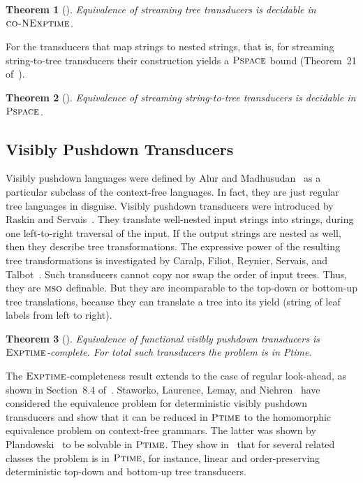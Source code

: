 \documentclass[copyright,creativecommons]{eptcs}
\newtheorem{theorem}{Theorem}
\newcommand{\mso}{\textsc{mso}}
\newcommand{\dexptime}{\textsc{Exptime}}
\newcommand{\conexptime}{\textsc{co-NExptime}}
\newcommand{\pspace}{\textsc{Pspace}}
\newcommand{\Ptime}{\textsc{Ptime}}
\begin{document}
\begin{theorem}[\cite{DBLP:journals/corr/abs-1104-2599}]
Equivalence of streaming tree transducers is decidable in $\conexptime$.
\end{theorem}

For the transducers that map strings to nested strings, that is, for streaming
string-to-tree transducers their construction yields a $\pspace$ bound
(Theorem~21 of~\cite{DBLP:journals/corr/abs-1104-2599}).

\begin{theorem}[\cite{DBLP:journals/corr/abs-1104-2599}]
Equivalence of streaming string-to-tree transducers is decidable in $\pspace$.
\end{theorem}

\subsection{Visibly Pushdown Transducers}

Visibly pushdown languages were defined by Alur and Madhusudan~\cite{DBLP:conf/stoc/AlurM04} as
a particular subclass of the context-free languages. In fact, they are
just regular tree languages in disguise.
Visibly pushdown transducers were introduced by 
Raskin and Servais~\cite{DBLP:conf/icalp/RaskinS08}.
They translate well-nested input strings into strings, during one left-to-right
traversal of the input. 
If the output strings are nested as well, then they describe tree
transformations. The expressive power of the resulting tree transformations
is investigated by Caralp, Filiot, Reynier, Servais, and 
Talbot~\cite{DBLP:journals/corr/CaralpFRST13}. 
Such transducers cannot copy nor swap the order of input trees. Thus, they
are $\mso$ definable. But they are incomparable to the top-down or bottom-up
tree translations, because they can translate a tree into its yield (string
of leaf labels from left to right).

\begin{theorem}[\cite{DBLP:conf/mfcs/FiliotRRST10}]
Equivalence of functional visibly pushdown transducers
is $\dexptime$-complete. For total such transducers the problem is
in {\sc Ptime}.
\end{theorem}

The $\dexptime$-completeness result extends to the case
of regular look-ahead, as shown in Section~8.4 of~\cite{DBLP:conf/sofsem/FiliotS12,Servais11}.
Staworko, Laurence, Lemay, and Niehren~\cite{DBLP:conf/fct/StaworkoLLN09} have considered the
equivalence problem for deterministic visibly pushdown transducers and show
that it can be reduced in $\Ptime$ to the homomorphic equivalence problem
on context-free grammars. The latter was shown by 
Plandowski~\cite{DBLP:journals/jcss/KarhumakiPR95,DBLP:conf/esa/Plandowski94}
to be solvable in $\Ptime$.
They show in~\cite{DBLP:conf/fct/StaworkoLLN09}
that for several related classes the problem is in $\Ptime$,
for instance, linear and order-preserving deterministic top-down and
bottom-up tree transducers. 
\end{document}
